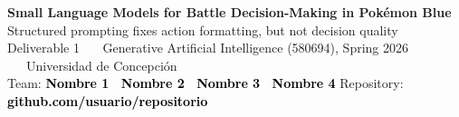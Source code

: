 \documentclass[9pt,a4paper]{extarticle}
\newcommand{\ph}[1]{\colorbox{yellow!60}{\textcolor{black}{\textbf{#1}}}}
\begin{document}
\small

\begin{tcolorbox}[colback=navy,colframe=navy,boxrule=0pt,left=3mm,right=3mm,
                  top=2mm,bottom=2mm,arc=1mm]
{\color{white}\bfseries\LARGE Small Language Models for Battle Decision-Making in Pok\'emon Blue}\\[1.1mm]
{\color{white!85}\large Structured prompting fixes action formatting, but not decision quality}\\[2mm]
{\color{white!75}\footnotesize
Deliverable 1 \ \textbullet\ \ Generative Artificial Intelligence (580694), Spring 2026 \ \textbullet\ \ Universidad de Concepci\'on}\\[1.4mm]
{\footnotesize\color{white!85}Team:} \ph{Nombre 1 \textbullet\ Nombre 2 \textbullet\ Nombre 3 \textbullet\ Nombre 4}
\hfill
{\footnotesize\color{white!85}Repository:} \ph{github.com/usuario/repositorio}
\end{tcolorbox}
\end{document}
